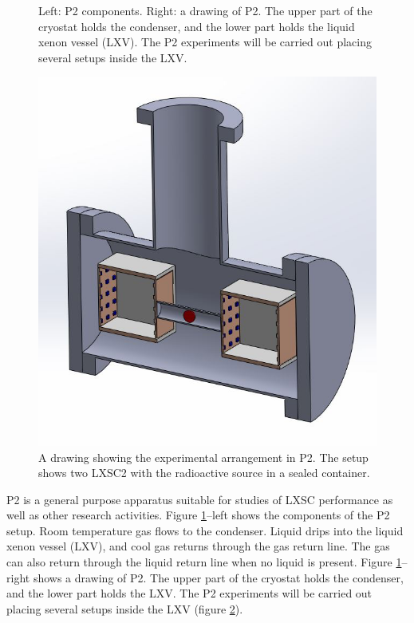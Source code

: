 \begin{figure}[!htb]
	\caption{\label{fig.cryo} Left: P2 components. Right: a drawing of P2. The upper part of the cryostat holds the condenser, and the lower part holds the liquid xenon vessel (LXV). The P2 experiments will be carried out placing several setups inside the LXV.}
\end{figure}

\begin{figure}[!htb]
	\centering
	\includegraphics[scale=0.45]{img/P2.png}
	\caption{\label{fig.P2} A drawing showing the experimental arrangement in P2. The setup shows two LXSC2 with the radioactive source in a sealed container. }
\end{figure}

P2 is a general purpose apparatus suitable for studies of LXSC performance as well as other research activities. Figure \ref{fig.cryo}--left shows the components of the P2 setup. Room temperature gas flows to the condenser. Liquid drips into the liquid xenon vessel (LXV), and cool gas returns through the gas return line. The gas can also return through the liquid return line when no liquid is present. Figure \ref{fig.cryo}--right shows a drawing of P2. The upper part of the cryostat holds the condenser, and the lower part holds the LXV. The P2 experiments will be carried out placing several setups inside the LXV (figure \ref{fig.P2}). 

